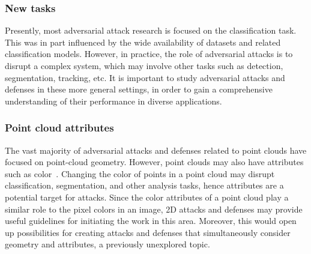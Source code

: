\documentclass{ieeeaccess}
\begin{document}
\subsubsection{New tasks} 
Presently, most adversarial attack research is focused on the classification task. This was in part influenced by the wide availability of datasets and related classification models. However, in practice, the role of adversarial attacks is to disrupt a complex system, which may involve other tasks such as detection, segmentation, tracking, etc. It is important to study adversarial attacks and defenses in these more general settings, %
in order to gain a comprehensive understanding of their performance in diverse applications.


\subsubsection{Point cloud attributes} 
The vast majority of adversarial attacks and defenses related to point clouds have focused on point-cloud geometry. However, point clouds may also have attributes such as color~\cite{8i2017color}. Changing the color of points in a point cloud may disrupt classification, segmentation, and other analysis tasks, hence attributes are a potential target for attacks. Since the color attributes of a point cloud play a similar role to the pixel colors in an image, 2D attacks and defenses may provide useful guidelines for initiating the work in this area. Moreover, this would open up possibilities for creating attacks and defenses that simultaneously consider geometry and attributes, a previously unexplored topic.



\end{document}
